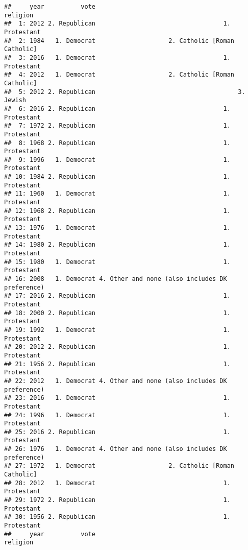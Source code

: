 \documentclass[
]{article}
\newenvironment{Shaded}{\begin{snugshade}}{\end{snugshade}}
\newcommand{\KeywordTok}[1]{\textcolor[rgb]{0.13,0.29,0.53}{\textbf{#1}}}
\newcommand{\NormalTok}[1]{#1}
\newcommand{\OperatorTok}[1]{\textcolor[rgb]{0.81,0.36,0.00}{\textbf{#1}}}
\newcommand{\StringTok}[1]{\textcolor[rgb]{0.31,0.60,0.02}{#1}}
\begin{document}
\begin{verbatim}
##     year          vote                                        religion
##  1: 2012 2. Republican                                   1. Protestant
##  2: 1984   1. Democrat                    2. Catholic [Roman Catholic]
##  3: 2016   1. Democrat                                   1. Protestant
##  4: 2012   1. Democrat                    2. Catholic [Roman Catholic]
##  5: 2012 2. Republican                                       3. Jewish
##  6: 2016 2. Republican                                   1. Protestant
##  7: 1972 2. Republican                                   1. Protestant
##  8: 1968 2. Republican                                   1. Protestant
##  9: 1996   1. Democrat                                   1. Protestant
## 10: 1984 2. Republican                                   1. Protestant
## 11: 1960   1. Democrat                                   1. Protestant
## 12: 1968 2. Republican                                   1. Protestant
## 13: 1976   1. Democrat                                   1. Protestant
## 14: 1980 2. Republican                                   1. Protestant
## 15: 1980   1. Democrat                                   1. Protestant
## 16: 2008   1. Democrat 4. Other and none (also includes DK preference)
## 17: 2016 2. Republican                                   1. Protestant
## 18: 2000 2. Republican                                   1. Protestant
## 19: 1992   1. Democrat                                   1. Protestant
## 20: 2012 2. Republican                                   1. Protestant
## 21: 1956 2. Republican                                   1. Protestant
## 22: 2012   1. Democrat 4. Other and none (also includes DK preference)
## 23: 2016   1. Democrat                                   1. Protestant
## 24: 1996   1. Democrat                                   1. Protestant
## 25: 2016 2. Republican                                   1. Protestant
## 26: 1976   1. Democrat 4. Other and none (also includes DK preference)
## 27: 1972   1. Democrat                    2. Catholic [Roman Catholic]
## 28: 2012   1. Democrat                                   1. Protestant
## 29: 1972 2. Republican                                   1. Protestant
## 30: 1956 2. Republican                                   1. Protestant
##     year          vote                                        religion
\end{verbatim}

\begin{Shaded}
\end{Shaded}
\end{document}
